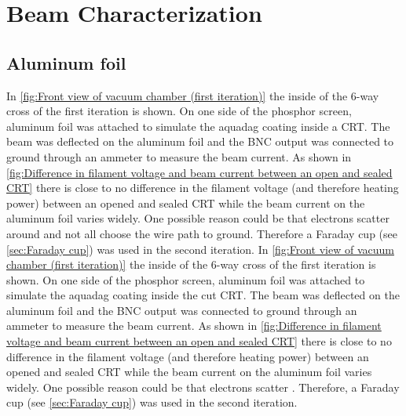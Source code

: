 
\chapter{Beam Characterization}
\label{ch:Beam Characterization}


\section{Aluminum foil}
\label{sec:Aluminum foil}

In \cref{fig:Front view of vacuum chamber (first iteration)} the inside of the 6-way cross of the first iteration is shown. On one side of the phosphor screen, aluminum foil was attached to simulate the aquadag coating inside a CRT. The beam was deflected on the aluminum foil and the BNC output was connected to ground through an ammeter to measure the beam current. As shown in \cref{fig:Difference in filament voltage and beam current between an open and sealed CRT} there is close to no difference in the filament voltage (and therefore heating power) between an opened and sealed CRT while the beam current on the aluminum foil varies widely. One possible reason could be that electrons scatter around and not all choose the wire path to ground. Therefore a Faraday cup (see \cref{sec:Faraday cup}) was used in the second iteration.
In \cref{fig:Front view of vacuum chamber (first iteration)} the inside of the 6-way cross of the first iteration is shown. On one side of the phosphor screen, aluminum foil was attached to simulate the aquadag coating inside the cut CRT. The beam was deflected on the aluminum foil and the BNC output was connected to ground through an ammeter to measure the beam current. As shown in \cref{fig:Difference in filament voltage and beam current between an open and sealed CRT} there is close to no difference in the filament voltage (and therefore heating power) between an opened and sealed CRT while the beam current on the aluminum foil varies widely. One possible reason could be that electrons scatter . Therefore, a Faraday cup (see \cref{sec:Faraday cup}) was used in the second iteration.


